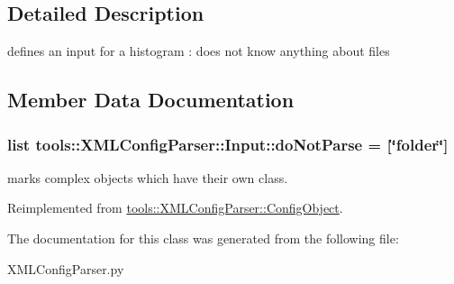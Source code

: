 \subsection{Detailed Description}
defines an input for a histogram : does not know anything about files 

\subsection{Member Data Documentation}
\hypertarget{classtools_1_1XMLConfigParser_1_1Input_02daa3ad92bdc203274e117a88ec8543}{
\subsubsection{\setlength{\rightskip}{0pt plus 5cm}list {\bf tools::XMLConfigParser::Input::doNotParse} = \mbox{[}\char`\"{}folder\char`\"{}\mbox{]}}}
\label{classtools_1_1XMLConfigParser_1_1Input_02daa3ad92bdc203274e117a88ec8543}


marks complex objects which have their own class. 



Reimplemented from \hyperlink{classtools_1_1XMLConfigParser_1_1ConfigObject}{tools::XMLConfigParser::ConfigObject}.

The documentation for this class was generated from the following file:\begin{CompactItemize}
\item 
XMLConfigParser.py\end{CompactItemize}
